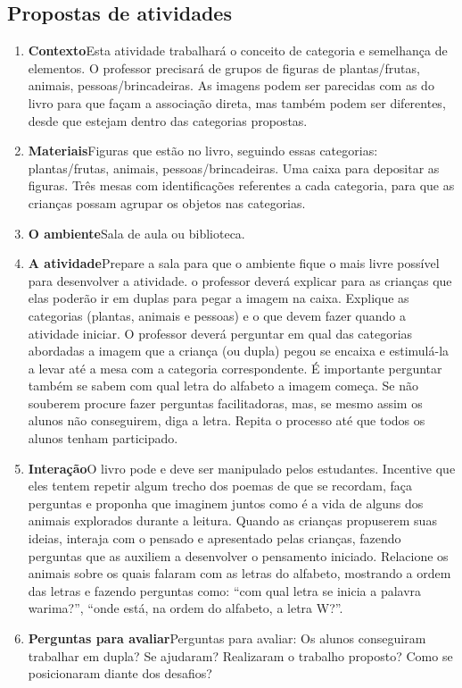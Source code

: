 \documentclass[11pt]{extarticle}
\begin{document}
\subsection{Propostas de atividades}



\begin{enumerate}
\item \textbf{Contexto}\quad Esta atividade trabalhará o conceito de categoria e semelhança de elementos. O professor precisará de grupos de figuras de  plantas/frutas, animais, pessoas/brincadeiras. As imagens podem ser parecidas com as do livro para que façam a associação direta, mas também podem ser diferentes, desde que estejam dentro das categorias propostas. 

\item \textbf{Materiais}\quad Figuras que estão no livro, seguindo essas categorias: plantas/frutas, animais, pessoas/brincadeiras. Uma caixa para depositar as figuras. Três mesas com identificações referentes a cada categoria, para que as crianças possam agrupar os objetos nas categorias. 

\item \textbf{O ambiente}\quad Sala de aula ou biblioteca. 

\item \textbf{A atividade}\quad Prepare a sala para que o ambiente fique o mais livre possível para desenvolver a atividade. o professor deverá explicar para as crianças que elas poderão ir em duplas para pegar a imagem na caixa. Explique as categorias (plantas, animais e pessoas) e o que devem fazer quando a atividade iniciar. O professor deverá perguntar em qual das categorias abordadas a imagem que a criança (ou dupla) pegou se encaixa e estimulá-la a levar até a mesa com a categoria correspondente. É importante perguntar também se sabem com qual letra do alfabeto a imagem começa. Se não souberem procure fazer perguntas facilitadoras, mas, se mesmo assim os alunos não conseguirem, diga a letra. Repita o processo até que todos os alunos tenham participado.

\item \textbf{Interação}\quad O livro pode e deve ser 
manipulado pelos estudantes. Incentive que eles tentem repetir algum trecho dos poemas de que se recordam,
faça perguntas e proponha que imaginem juntos como é a vida 
de alguns dos animais explorados durante a leitura. Quando as crianças propuserem suas ideias, interaja com o pensado e apresentado pelas crianças, fazendo perguntas que as auxiliem a desenvolver o pensamento iniciado.
Relacione os animais sobre os quais falaram com as letras do alfabeto, mostrando a ordem das letras e fazendo perguntas como: ``com qual letra se inicia a palavra warima?'', ``onde está, na ordem do alfabeto, a letra W?''.

\item \textbf{Perguntas para avaliar}\quad Perguntas para avaliar: Os alunos conseguiram trabalhar em dupla? Se ajudaram? Realizaram o trabalho proposto? Como se posicionaram diante dos desafios? 
\end{enumerate}
\end{document}
